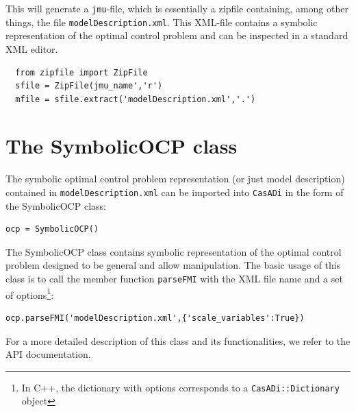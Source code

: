 \documentclass[a4paper,12pt]{book}
\newcommand{\CasADi}{\texttt{CasADi}\xspace}
\begin{document}
This will generate a \texttt{jmu}-file, which is essentially a zipfile containing, among other things, the file \texttt{modelDescription.xml}. This XML-file contains a symbolic representation of the optimal control problem and can be inspected in a standard XML editor.
\begin{verbatim}
  from zipfile import ZipFile
  sfile = ZipFile(jmu_name','r')
  mfile = sfile.extract('modelDescription.xml','.')
\end{verbatim}

\section{The SymbolicOCP class} \label{sec:modelica_import}
The symbolic optimal control problem representation (or just model description) contained in \texttt{modelDescription.xml} can be imported into \CasADi in the form of the SymbolicOCP class:
\begin{verbatim}
ocp = SymbolicOCP()
\end{verbatim}

The SymbolicOCP class contains symbolic representation of the optimal control problem designed to be general and allow manipulation. The basic usage of this class is to call the member function \texttt{parseFMI} with the XML file name and a set of options\footnote{In C++, the dictionary with options corresponds to a \texttt{CasADi::Dictionary} object}:
\begin{verbatim}
ocp.parseFMI('modelDescription.xml',{'scale_variables':True})
\end{verbatim}

For a more detailed description of this class and its functionalities, we refer to the API documentation.
\end{document}
